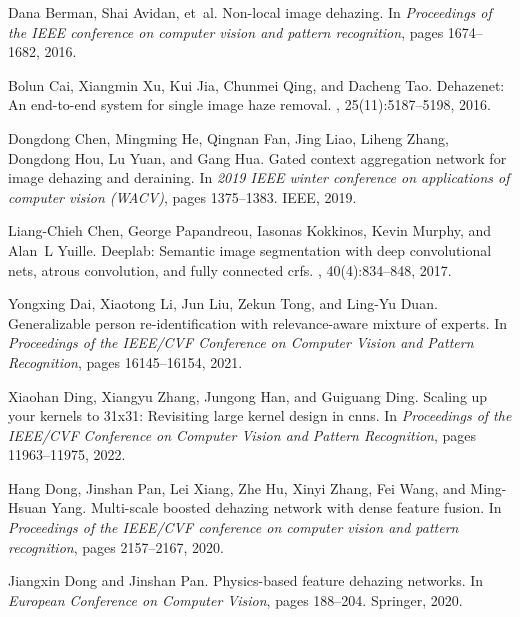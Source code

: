 \documentclass[10pt,twocolumn,letterpaper]{article}
\begin{document}
\begin{thebibliography}{10}\itemsep=-1pt

Dana Berman, Shai Avidan, et~al.
\newblock Non-local image dehazing.
\newblock In {\em Proceedings of the IEEE conference on computer vision and
  pattern recognition}, pages 1674--1682, 2016.

Bolun Cai, Xiangmin Xu, Kui Jia, Chunmei Qing, and Dacheng Tao.
\newblock Dehazenet: An end-to-end system for single image haze removal.
, 25(11):5187--5198, 2016.

Dongdong Chen, Mingming He, Qingnan Fan, Jing Liao, Liheng Zhang, Dongdong Hou,
  Lu Yuan, and Gang Hua.
\newblock Gated context aggregation network for image dehazing and deraining.
\newblock In {\em 2019 IEEE winter conference on applications of computer
  vision (WACV)}, pages 1375--1383. IEEE, 2019.

Liang-Chieh Chen, George Papandreou, Iasonas Kokkinos, Kevin Murphy, and Alan~L
  Yuille.
\newblock Deeplab: Semantic image segmentation with deep convolutional nets,
  atrous convolution, and fully connected crfs.
,
  40(4):834--848, 2017.

Yongxing Dai, Xiaotong Li, Jun Liu, Zekun Tong, and Ling-Yu Duan.
\newblock Generalizable person re-identification with relevance-aware mixture
  of experts.
\newblock In {\em Proceedings of the IEEE/CVF Conference on Computer Vision and
  Pattern Recognition}, pages 16145--16154, 2021.

Xiaohan Ding, Xiangyu Zhang, Jungong Han, and Guiguang Ding.
\newblock Scaling up your kernels to 31x31: Revisiting large kernel design in
  cnns.
\newblock In {\em Proceedings of the IEEE/CVF Conference on Computer Vision and
  Pattern Recognition}, pages 11963--11975, 2022.

Hang Dong, Jinshan Pan, Lei Xiang, Zhe Hu, Xinyi Zhang, Fei Wang, and
  Ming-Hsuan Yang.
\newblock Multi-scale boosted dehazing network with dense feature fusion.
\newblock In {\em Proceedings of the IEEE/CVF conference on computer vision and
  pattern recognition}, pages 2157--2167, 2020.

Jiangxin Dong and Jinshan Pan.
\newblock Physics-based feature dehazing networks.
\newblock In {\em European Conference on Computer Vision}, pages 188--204.
  Springer, 2020.


\end{thebibliography}
\end{document}
